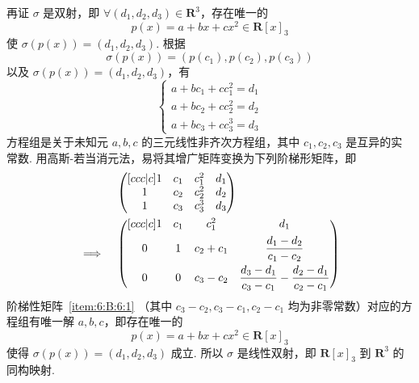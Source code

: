 \documentclass[12pt,fontset=fandol]{ctexart}
\begin{document}
\begin{solve}
          再证 $ \sigma $ 是双射，即 $ \forall (d_1, d_2, d_3) \in \mathbf{R}^3 $，存在唯一的
          \[ p(x) = a + bx + cx^2 \in \mathbf{R}[x]_3 \]
          使 $ \sigma(p(x)) = (d_1, d_2, d_3) $. 根据
          \[ \sigma(p(x)) = (p(c_1), p(c_2), p(c_3)) \]
          以及 $ \sigma(p(x)) = (d_1, d_2, d_3) $，有
          \[ \begin{cases}
                  a + bc_1 + cc_1^2 = d_1 \\
                  a + bc_2 + cc_2^2 = d_2 \\
                  a + bc_3 + cc_3^3 = d_3
              \end{cases} \]
          方程组是关于未知元 $ a, b, c $ 的三元线性非齐次方程组，其中 $ c_1, c_2, c_3 $ 是互异的实常数. 用高斯-若当消元法，易将其增广矩阵变换为下列阶梯形矩阵，即
          \begin{align}
                             & \begin{pmatrix}[ccc|c]
                                   1 & c_1 & c_1^2 & d_1 \\
                                   1 & c_2 & c_2^2 & d_2 \\
                                   1 & c_3 & c_3^3 & d_3
                               \end{pmatrix} \notag                                                                    \\
              \implies \quad & \begin{pmatrix}[ccc|c]
                                   1 & c_1 & c_1^2     & d_1                                                         \\[1ex]
                                   0 & 1   & c_2 + c_1 & \dfrac{d_1 - d_2}{c_1 - c_2}                                \\[2ex]
                                   0 & 0   & c_3 - c_2 & \dfrac{d_3 - d_1}{c_3 - c_1} - \dfrac{d_2 - d_1}{c_2 - c_1}
                               \end{pmatrix} \label{item:6:B:6:1}
          \end{align}
          阶梯性矩阵~\eqref{item:6:B:6:1} （其中 $ c_3 - c_2, c_3 - c_1, c_2 - c_1 $ 均为非零常数）对应的方程组有唯一解 $ a, b, c $，即存在唯一的
          \[ p(x) = a + bx + cx^2 \in \mathbf{R}[x]_3 \]
          使得 $ \sigma(p(x)) = (d_1, d_2, d_3) $ 成立. 所以 $ \sigma $ 是线性双射，即 $ \mathbf{R}[x]_3 $ 到 $ \mathbf{R}^3 $ 的同构映射.
\end{solve}
\end{document}
